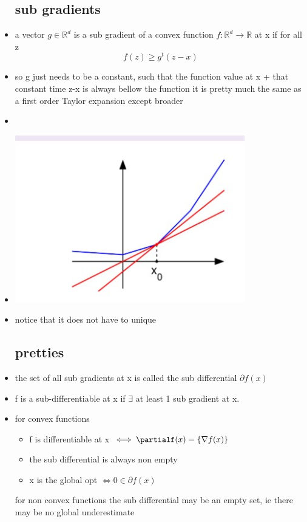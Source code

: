 \documentclass{article}
\begin{document}
\begin{itemize}
\subsection{sub gradients}
\item a vector $g\in \mathbb{R}^{d}$ is a sub gradient of a convex function $f:\mathbb{R}^{d}\rightarrow \mathbb{R}$ at x if for all z $$f(z)\geq g^{t}(z-x)$$
\item so g just needs to be a constant, such that the function value at x + that constant time z-x is always bellow the function it is pretty much the same as a first order Taylor expansion except broader
\item \item \includegraphics[width=10cm]{lecture_notes/lecture_4/immmages/l4_9.jpg}
\item notice that it does not have to unique 
\subsection{pretties}
\item the set of all sub gradients at x is called the sub differential $\partial f(x)$
\item f is a sub-differentiable at x if $\exists$ at least 1 sub gradient  at x.
\item for convex functions
\begin{itemize}
    \item f is differentiable  at x $\iff \partialf(x)=\{\nabla f(x)\}$
    \item the sub differential is always non empty 
    \item x is the global opt $\iff 0\in \partial f(x)$
\end{itemize}
\itme for non convex functions the sub differential may be an empty set, ie there may be no global underestimate 

\end{itemize}
\end{document}
